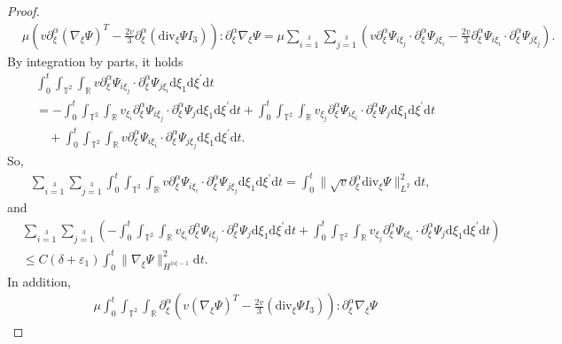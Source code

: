 \documentclass[10pt,reqno]{amsart}
\numberwithin{equation}{section}
\newcommand{\dif}{\mathrm{d}}
\newcommand{\ddiv}{\mathrm{div}}
\begin{document}
\begin{proof}
\begin{align*}
	&{\mu}\left(v\partial_\xi^\alpha\left(\nabla_\xi\Psi\right)^T
	-\frac{2v}{3}\partial_\xi^\alpha\left(\ddiv_\xi\Psi I_3\right)\right):\partial_\xi^\alpha\nabla_\xi\Psi
	=
	\mu\sum\limits_{i=1}\limits^3\sum\limits_{j=1}\limits^3
	\left(
	v \partial_\xi^\alpha\Psi_{i\xi_j}\cdot\partial_\xi^\alpha\Psi_{j\xi_i}
	-\frac{2v}{3} \partial_\xi^\alpha\Psi_{i\xi_i}\cdot\partial_\xi^\alpha\Psi_{j\xi_j}
	\right).
\end{align*}
By integration by parts, it holds
\begin{align*}
	&\int_0^t\int_{\mathbb{T}^2}\int_{\mathbb{R}}v \partial_\xi^\alpha\Psi_{i\xi_j}\cdot\partial_\xi^\alpha\Psi_{j\xi_i}
	\dif \xi_1\dif \xi^{\prime}\dif t\\
	&=
	-\int_0^t\int_{\mathbb{T}^2}\int_{\mathbb{R}}v_{\xi_i} \partial_\xi^\alpha\Psi_{i\xi_j}\cdot\partial_\xi^\alpha\Psi_{j}
	\dif \xi_1\dif \xi^{\prime}\dif t
	+\int_0^t\int_{\mathbb{T}^2}\int_{\mathbb{R}}v_{\xi_j} \partial_\xi^\alpha\Psi_{i\xi_i}\cdot\partial_\xi^\alpha\Psi_{j}
	\dif \xi_1\dif \xi^{\prime}\dif t\\
	&\quad+\int_0^t\int_{\mathbb{T}^2}\int_{\mathbb{R}}v \partial_\xi^\alpha\Psi_{i\xi_i}\cdot\partial_\xi^\alpha\Psi_{j\xi_j}
	\dif \xi_1\dif \xi^{\prime}\dif t.
\end{align*}
So,
\begin{align*}
	\sum\limits_{i=1}\limits^3\sum\limits_{j=1}\limits^3
	\int_0^t\int_{\mathbb{T}^2}\int_{\mathbb{R}}v \partial_\xi^\alpha\Psi_{i\xi_i}\cdot\partial_\xi^\alpha\Psi_{j\xi_j}
	\dif \xi_1\dif \xi^{\prime}\dif t
	=\int_0^t
	\|\sqrt{v} \partial_\xi^\alpha\ddiv_\xi\Psi\|_{L^2}^2
	\dif t
	,
\end{align*}
and
	\begin{align*}
		&\sum\limits_{i=1}\limits^3\sum\limits_{j=1}\limits^3
		\left(-\int_0^t\int_{\mathbb{T}^2}\int_{\mathbb{R}}v_{\xi_i} \partial_\xi^\alpha\Psi_{i\xi_j}\cdot\partial_\xi^\alpha\Psi_{j}
		\dif \xi_1\dif \xi^{\prime}\dif t
		+\int_0^t\int_{\mathbb{T}^2}\int_{\mathbb{R}}v_{\xi_j} \partial_\xi^\alpha\Psi_{i\xi_i}\cdot\partial_\xi^\alpha\Psi_{j}
		\dif \xi_1\dif \xi^{\prime}\dif t\right)\\
		&\le C(\delta+\varepsilon_1)
		\int_0^t \|\nabla_\xi\Psi\|^2_{H^{|\alpha|-1}}
		\dif t
		.
	\end{align*}
In addition,
	\begin{align*}
		&\mu\int_0^t\int_{\mathbb{T}^2}\int_{\mathbb{R}}
		\partial_\xi^\alpha\left(v\left(\nabla_\xi\Psi\right)^T
		-\frac{2v}{3}\left(\ddiv_\xi\Psi I_3\right)\right):\partial_\xi^\alpha\nabla_\xi\Psi

\end{align*}
\end{proof}
\end{document}
